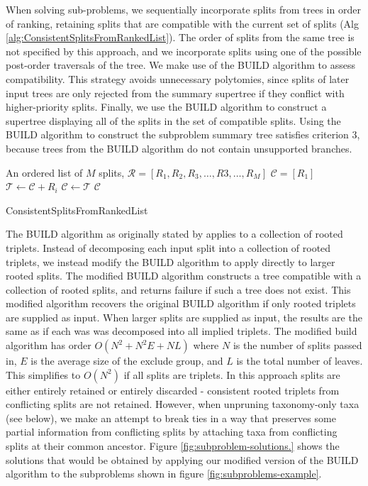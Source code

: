 \documentclass[fleqn,12pt,lineno,english]{wlpeerj}
\begin{document}
When solving sub-problems, we sequentially incorporate splits from
trees in order of ranking, retaining splits that are compatible with
the current set of splits (Alg \ref{alg:ConsistentSplitsFromRankedList}).
The order of splits from the same tree is not specified by this approach,
and we incorporate splits using one of the possible post-order traversals
of the tree. We make use of the BUILD algorithm \citep{AhoSSU1981}
to assess compatibility. This strategy avoids unnecessary polytomies,
since splits of later input trees are only rejected from the summary
supertree if they conflict with higher-priority splits. Finally, we
use the BUILD algorithm to construct a supertree displaying all of
the splits in the set of compatible splits. Using the BUILD algorithm
to construct the subproblem summary tree satisfies criterion 3, because
trees from the BUILD algorithm do not contain unsupported branches.
\begin{algorithm}
\begin{algorithmic}
\Require An ordered list of $M$ splits, $\mathcal{R} = [R_1, R_2, R_3, \ldots, R3, \ldots, R_M]$
\State $\mathcal{C} = [R_1]$
   \State $\mathcal{T} \leftarrow \mathcal{C} + R_i$ 
      \State $\mathcal{C} \leftarrow \mathcal{T}$
   \EndIf
\EndFor{}
\State\Return $\mathcal{C}$
\end{algorithmic}

\caption{\label{alg:ConsistentSplitsFromRankedList}ConsistentSplitsFromRankedList}
\end{algorithm}

The BUILD algorithm as originally stated by \citet{AhoSSU1981} applies
to a collection of rooted triplets. Instead of decomposing each input
split into a collection of rooted triplets, we instead modify the
BUILD algorithm to apply directly to larger rooted splits. The modified
BUILD algorithm constructs a tree compatible with a collection of
rooted splits, and returns failure if such a tree does not exist.
This modified algorithm recovers the original BUILD algorithm if only
rooted triplets are supplied as input. When larger splits are supplied
as input, the results are the same as if each was was decomposed into
all implied triplets. The modified build algorithm has order $O(N^{2}+N^{2}E+NL)$
where $N$ is the number of splits passed in, $E$ is the average
size of the exclude group, and $L$ is the total number of leaves.
This simplifies to $O(N^{2})$ if all splits are triplets. In this
approach splits are either entirely retained or entirely discarded
- consistent rooted triplets from conflicting splits are not retained.
However, when unpruning taxonomy-only taxa (see below), we make an
attempt to break ties in a way that preserves some partial information
from conflicting splits by attaching taxa from conflicting splits
at their common ancestor. Figure \ref{fig:subproblem-solutions.}
shows the solutions that would be obtained by applying our modified
version of the BUILD algorithm to the subproblems shown in figure \ref{fig:subproblems-example}.
\end{document}
